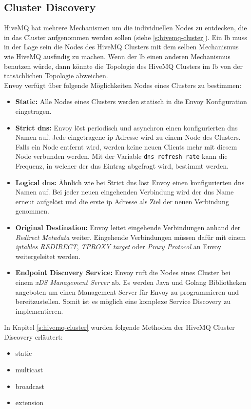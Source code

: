 \subsection{Cluster Discovery} \label{ss:cluster-discovery}
HiveMQ hat mehrere Mechanismen um die individuellen Nodes zu entdecken, die in das Cluster aufgenommen werden sollen (siehe \ref{s:hivemq-cluster}).
Ein \acl{lb} muss in der Lage sein die Nodes des HiveMQ Clusters mit dem selben Mechanismus wie HiveMQ ausfindig zu machen. Wenn der \ac{lb} einen anderen Mechanismus benutzen würde, dann könnte die Topologie des HiveMQ Clusters im \ac{lb} von der tatsächlichen Topologie abweichen.\\
Envoy verfügt über folgende Möglichkeiten Nodes eines Clusters zu bestimmen:
\begin{itemize}
  \item \textbf{Static:} Alle Nodes eines Clusters werden statisch in die Envoy Konfiguration eingetragen.
  \item \textbf{Strict \ac{dns}:} Envoy löst periodisch und asynchron einen konfigurierten \ac{dns} Namen auf. Jede eingetragene \ac{ip} Adresse wird zu einem Node des Clusters. Falls ein Node entfernt wird, werden keine neuen Clients mehr mit diesem Node verbunden werden. Mit der Variable \verb|dns_refresh_rate| kann die Frequenz, in welcher der \ac{dns} Eintrag abgefragt wird, bestimmt werden.
  \item \textbf{Logical \ac{dns}:} Ähnlich wie bei Strict \ac{dns} löst Envoy einen konfigurierten \ac{dns} Namen auf. Bei jeder neuen eingehenden Verbindung wird der \ac{dns} Name erneut aufgelöst und die erste \ac{ip} Adresse als Ziel der neuen Verbindung genommen.
  \item \textbf{Original Destination:} Envoy leitet eingehende Verbindungen anhand der \textit{Redirect Metadata} weiter. Eingehende Verbindungen müssen dafür mit einem \textit{iptables REDIRECT}, \textit{TPROXY target} oder \textit{Proxy Protocol} an Envoy weitergeleitet werden.
  \item \textbf{Endpoint Discovery Service:} Envoy ruft die Nodes eines Cluster bei einem \textit{xDS Management Server} ab. Es werden Java und Golang Bibliotheken angeboten um einen Management Server für Envoy zu programmieren und bereitzustellen. Somit ist es möglich eine komplexe Service Discovery zu implementieren.
\end{itemize}
\cite{ServiceDiscoveryEnvoy}
In Kapitel \ref{s:hivemq-cluster} wurden folgende Methoden der HiveMQ Cluster Discovery erläutert:
\begin{itemize}
  \item static
  \item multicast
  \item broadcast
  \item extension
\end{itemize}
